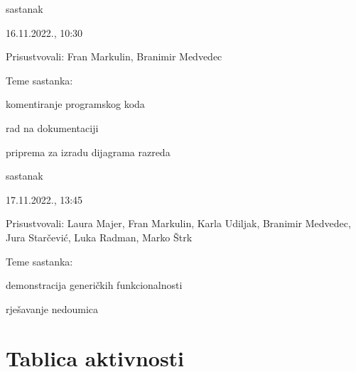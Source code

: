 \begin{packed_enum}
			\item  sastanak
			
			\item[] \begin{packed_item}
				\item 16.11.2022., 10:30
				\item Prisustvovali: Fran Markulin, Branimir Medvedec
				\item Teme sastanka: 
				\begin{packed_item}
					\item  komentiranje programskog koda
					\item rad na dokumentaciji
					\item priprema za izradu dijagrama razreda
				\end{packed_item}
			\end{packed_item}

			\item  sastanak
			
			\item[] \begin{packed_item}
				\item 17.11.2022., 13:45
				\item Prisustvovali: Laura Majer, Fran Markulin, Karla Udiljak, Branimir Medvedec, Jura Starčević, Luka Radman, Marko Štrk
				\item Teme sastanka: 
				\begin{packed_item}
					\item   demonstracija generičkih funkcionalnosti
					\item rješavanje nedoumica
				\end{packed_item}
			\end{packed_item}
			
			
		\end{packed_enum}
		
		\eject
		\section*{Tablica aktivnosti}
		
			

